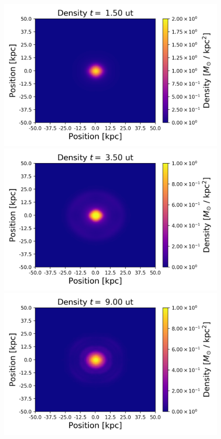 \begin{figure}[h!]
    \centering
    \includegraphics[scale=0.45]{imag/2dDens3.png}
    \includegraphics[scale=0.45]{imag/2dDens7.png}
    \includegraphics[scale=0.45]{imag/2dDens18.png}

\end{figure}

